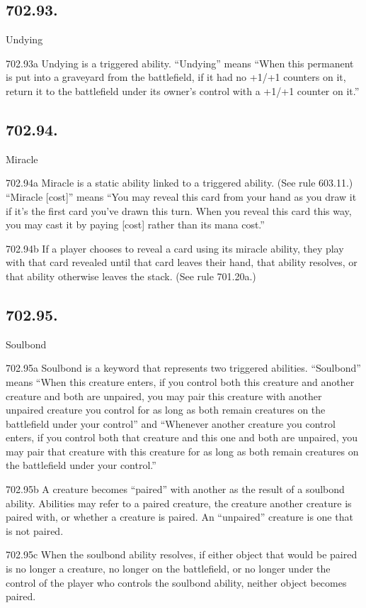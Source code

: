 \subsection*{702.93.}
Undying

702.93a Undying is a triggered ability. “Undying” means “When this permanent is put into a graveyard from the battlefield, if it had no +1/+1 counters on it, return it to the battlefield under its owner’s control with a +1/+1 counter on it.”

\subsection*{702.94.}
Miracle

702.94a Miracle is a static ability linked to a triggered ability. (See rule 603.11.) “Miracle [cost]” means “You may reveal this card from your hand as you draw it if it’s the first card you’ve drawn this turn. When you reveal this card this way, you may cast it by paying [cost] rather than its mana cost.”

702.94b If a player chooses to reveal a card using its miracle ability, they play with that card revealed until that card leaves their hand, that ability resolves, or that ability otherwise leaves the stack. (See rule 701.20a.)

\subsection*{702.95.}
Soulbond

702.95a Soulbond is a keyword that represents two triggered abilities. “Soulbond” means “When this creature enters, if you control both this creature and another creature and both are unpaired, you may pair this creature with another unpaired creature you control for as long as both remain creatures on the battlefield under your control” and “Whenever another creature you control enters, if you control both that creature and this one and both are unpaired, you may pair that creature with this creature for as long as both remain creatures on the battlefield under your control.”

702.95b A creature becomes “paired” with another as the result of a soulbond ability. Abilities may refer to a paired creature, the creature another creature is paired with, or whether a creature is paired. An “unpaired” creature is one that is not paired.

702.95c When the soulbond ability resolves, if either object that would be paired is no longer a creature, no longer on the battlefield, or no longer under the control of the player who controls the soulbond ability, neither object becomes paired.

